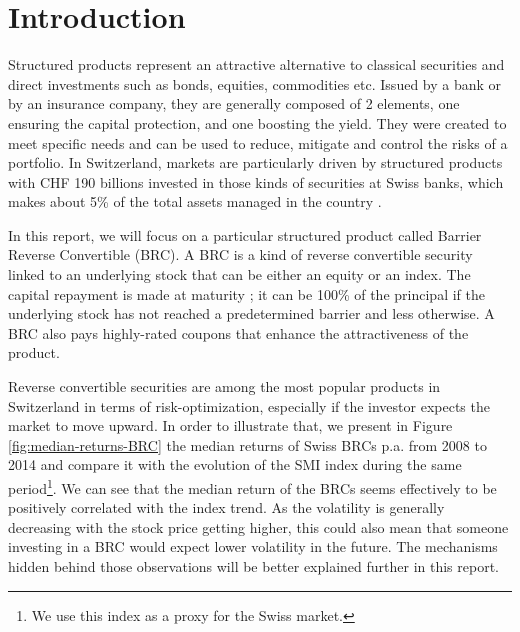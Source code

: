 \documentclass[a4paper,11pt,english]{book}
\begin{document}
\pagestyle{empty}
\tableofcontents
\listoffigures
\listoftables

\mainmatter
\chapter*{Introduction}
\vspace*{-2cm}

Structured products represent an attractive alternative to classical securities and direct investments such as bonds, equities, commodities etc. Issued by a bank or by an insurance company, they are generally composed of 2 elements, one ensuring the capital protection, and one boosting the yield. They were created to meet specific needs and can be used to reduce, mitigate and control the risks of a portfolio. In Switzerland, markets are particularly driven by structured products with CHF 190 billions invested in those kinds of securities at Swiss banks, which makes about 5\% of the total assets managed in the country \cite{SSPA}.

In this report, we will focus on a particular structured product called Barrier Reverse Convertible (BRC). A BRC is a kind of reverse convertible security linked to an underlying stock that can be either an equity or an index. The capital repayment is made at maturity ; it can be 100\% of the principal if the underlying stock has not reached a predetermined barrier and less otherwise. A BRC also pays highly-rated coupons that enhance the attractiveness of the product.

Reverse convertible securities are among the most popular products in Switzerland in terms of risk-optimization, especially if the investor expects the market to move upward. In order to illustrate that, we present in Figure \ref{fig:median-returns-BRC} the median returns of Swiss BRCs p.a. from 2008 to 2014 \cite{SSPA-study} and compare it with the evolution of the SMI index during the same period\footnote{We use this index as a proxy for the Swiss market.}. We can see that the median return of the BRCs seems effectively to be positively correlated with the index trend. As the volatility is generally decreasing with the stock price getting higher, this could also mean that someone investing in a BRC would expect lower volatility in the future. The mechanisms hidden behind those observations will be better explained further in this report.
\end{document}
